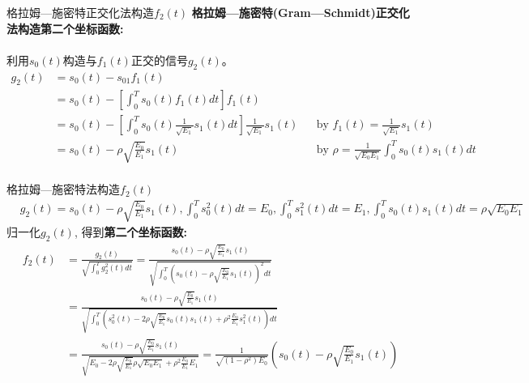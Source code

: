 \begin{frame}[shrink]{格拉姆---施密特正交化法构造$f_2(t)$}
\textbf{格拉姆---施密特(Gram---Schmidt)正交化法构造第二个坐标函数: }\\
~\\
利用$s_0(t)$构造与$f_1(t)$正交的信号$g_2(t)$。
\begin{align*}
g_2(t)&=s_0(t)-s_{01}f_1(t)\\
&=s_0(t)-\left[\int_{0}^{T}s_0(t)f_1(t)dt\right]f_1(t)\\
&=s_0(t)-\left[\int_{0}^{T}s_0(t)\frac{1}{\sqrt{E_1}}s_1(t)dt\right]\frac{1}{\sqrt{E_1}}s_1(t) &&\text{by }f_1(t)=\frac{1}{\sqrt{E_1}}s_1(t)\\
&=s_0(t)-\rho\sqrt{\frac{E_0}{E_1}}s_1(t) &&\text{by }\rho=\frac{1}{\sqrt{E_{0}E_{1}}}\int_{0}^{T}s_0(t)s_1(t)dt\\
\end{align*}
\end{frame}

\begin{frame}[shrink]{格拉姆---施密特法构造$f_2(t)$}
\begin{align*}
&g_2(t)=s_0(t)-\rho\sqrt{\frac{E_0}{E_1}}s_1(t), \int_{0}^{T}s_0^2(t)dt=E_0, \int_{0}^{T}s_1^2(t)dt=E_1, \int_{0}^{T}s_0(t)s_1(t)dt=\rho\sqrt{E_0E_1}
\end{align*}
归一化$g_2(t)$, 得到\textbf{第二个坐标函数:}
\begin{align*}
f_2(t)&=\frac{g_2(t)}{\sqrt{\int_{0}^{T}g_2^2(t)dt}}=\frac{s_0(t)-\rho\sqrt{\frac{E_0}{E_1}}s_1(t)}{\sqrt{\int_{0}^{T}\left(s_0(t)-\rho\sqrt{\frac{E_0}{E_1}}s_1(t)\right)^2dt}}\\
&=\frac{s_0(t)-\rho\sqrt{\frac{E_0}{E_1}}s_1(t)}{\sqrt{\int_{0}^{T}\left(s_0^2(t)-2\rho\sqrt{\frac{E_0}{E_1}}s_0(t)s_1(t)+\rho^2\frac{E_0}{E_1}s_1^2(t)\right)dt}}\\
&=\frac{s_0(t)-\rho\sqrt{\frac{E_0}{E_1}}s_1(t)}{\sqrt{E_0-2\rho\sqrt{\frac{E_0}{E_1}}\rho\sqrt{E_0E_1}+\rho^2\frac{E_0}{E_1}E_1}}
=\frac{1}{\sqrt{(1-\rho^2)E_0}}\left(s_0(t)-\rho\sqrt{\frac{E_0}{E_1}}s_1(t)\right)
\end{align*}
\end{frame}

